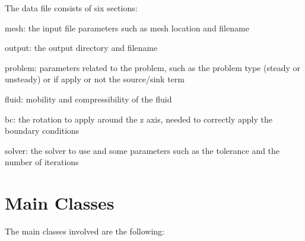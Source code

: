 The data file consists of six sections\+:
\begin{DoxyItemize}
\item {\ttfamily mesh\+:} the input file parameters such as mesh location and filename~\newline

\item {\ttfamily output\+:} the output directory and filename~\newline

\item {\ttfamily problem\+:} parameters related to the problem, such as the problem type (steady or unsteady) or if apply or not the source/sink term~\newline

\item {\ttfamily fluid\+:} mobility and compressibility of the fluid~\newline

\item {\ttfamily bc\+:} the rotation to apply around the z axis, needed to correctly apply the boundary conditions~\newline

\item {\ttfamily solver\+:} the solver to use and some parameters such as the tolerance and the number of iterations~\newline
 
\end{DoxyItemize}\hypertarget{index_class}{}\section{Main Classes}\label{index_class}
The main classes involved are the following\+:~\newline

